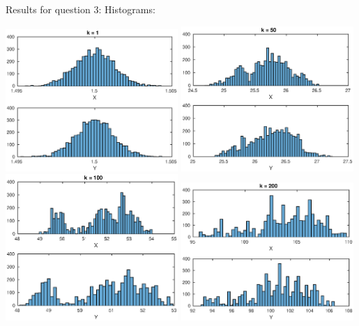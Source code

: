 \documentclass[english,DIV=13]{scrartcl}
\begin{document}
Results for question 3:
Histograms:
\begin{center}
   \includegraphics[width=0.49\textwidth]{img/q3_hist_1.eps}
   \includegraphics[width=0.49\textwidth]{img/q3_hist_50.eps}
   \includegraphics[width=0.49\textwidth]{img/q3_hist_100.eps}
   \includegraphics[width=0.49\textwidth]{img/q3_hist_200.eps}
\end{center}
\end{document}
